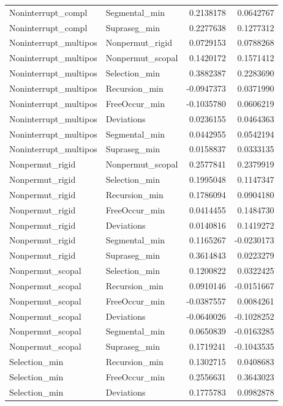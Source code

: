\documentclass[
]{article}
\begin{document}
\begin{longtable}[]{@{}llrr@{}}
Noninterrupt\_compl & Segmental\_min & 0.2138178 & 0.0642767 \\
Noninterrupt\_compl & Supraseg\_min & 0.2277638 & 0.1277312 \\
Noninterrupt\_multipos & Nonpermut\_rigid & 0.0729153 & 0.0788268 \\
Noninterrupt\_multipos & Nonpermut\_scopal & 0.1420172 & 0.1571412 \\
Noninterrupt\_multipos & Selection\_min & 0.3882387 & 0.2283690 \\
Noninterrupt\_multipos & Recursion\_min & -0.0947373 & 0.0371990 \\
Noninterrupt\_multipos & FreeOccur\_min & -0.1035780 & 0.0606219 \\
Noninterrupt\_multipos & Deviations & 0.0236155 & 0.0464363 \\
Noninterrupt\_multipos & Segmental\_min & 0.0442955 & 0.0542194 \\
Noninterrupt\_multipos & Supraseg\_min & 0.0158837 & 0.0333135 \\
Nonpermut\_rigid & Nonpermut\_scopal & 0.2577841 & 0.2379919 \\
Nonpermut\_rigid & Selection\_min & 0.1995048 & 0.1147347 \\
Nonpermut\_rigid & Recursion\_min & 0.1786094 & 0.0904180 \\
Nonpermut\_rigid & FreeOccur\_min & 0.0414455 & 0.1484730 \\
Nonpermut\_rigid & Deviations & 0.0140816 & 0.1419272 \\
Nonpermut\_rigid & Segmental\_min & 0.1165267 & -0.0230173 \\
Nonpermut\_rigid & Supraseg\_min & 0.3614843 & 0.0223279 \\
Nonpermut\_scopal & Selection\_min & 0.1200822 & 0.0322425 \\
Nonpermut\_scopal & Recursion\_min & 0.0910146 & -0.0151667 \\
Nonpermut\_scopal & FreeOccur\_min & -0.0387557 & 0.0084261 \\
Nonpermut\_scopal & Deviations & -0.0640026 & -0.1028252 \\
Nonpermut\_scopal & Segmental\_min & 0.0650839 & -0.0163285 \\
Nonpermut\_scopal & Supraseg\_min & 0.1719241 & -0.1043535 \\
Selection\_min & Recursion\_min & 0.1302715 & 0.0408683 \\
Selection\_min & FreeOccur\_min & 0.2556631 & 0.3643023 \\
Selection\_min & Deviations & 0.1775783 & 0.0982878 \\

\end{longtable}
\end{document}
